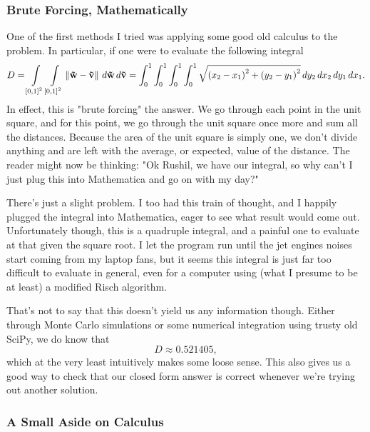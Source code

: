 \subsubsection{Brute Forcing, Mathematically}

One of the first methods I tried was applying some good old calculus to the
problem. In particular, if one were to evaluate the following integral
\[
    D = \int\displaylimits_{\left[ 0, 1 \right]^2} \int\displaylimits_{\left[ 0, 1 \right]^2} \left\lVert \mathbf{\vec{w}} - \mathbf{\vec{v}} \right\rVert \, d\mathbf{\vec{w}} \, d\mathbf{\vec{v}}
    = \int_{0}^{1} \int_{0}^{1} \int_{0}^{1} \int_{0}^{1} \sqrt{\left( x_2 - x_1 \right)^2 + \left( y_2 - y_1 \right)^2} \, dy_2 \, dx_2 \, dy_1 \, dx_1
.\]
In effect, this is "brute forcing" the answer. We go through each point in the
unit square, and for this point, we go through the unit square once more and
sum all the distances. Because the area of the unit square is simply one, we
don't divide anything and are left with the average, or expected, value of the
distance. The reader might now be thinking: "Ok Rushil, we have our integral,
so why can't I just plug this into Mathematica and go on with my day?"

There's just a slight problem. I too had this train of thought, and I happily
plugged the integral into Mathematica, eager to see what result would come out.
Unfortunately though,  this
is a quadruple integral, and a painful one to evaluate at that given the square
root. I let the program run until the jet engines noises start coming from my
laptop fans, but it seems this integral is just far too difficult to evaluate
in general, even for a computer using (what I presume to be at least) a
modified Risch algorithm.

That's not to say that this doesn't yield us any information though. Either
through Monte Carlo simulations or some numerical integration using trusty old
SciPy, we do know that
\[
    D \approx 0.521405
,\]
which at the very least intuitively makes some loose sense. This also gives us
a good way to check that our closed form answer is correct whenever we're
trying out another solution.

\subsubsection{A Small Aside on Calculus}

